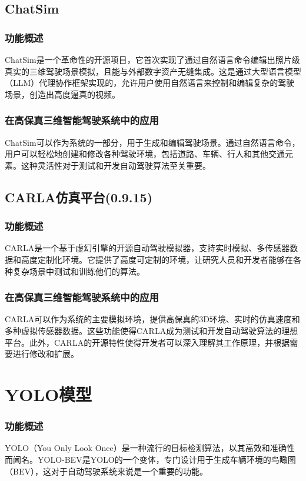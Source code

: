 \documentclass{article}
\begin{document}
\subsection*{ChatSim}
\subsubsection*{功能概述}
ChatSim是一个革命性的开源项目，它首次实现了通过自然语言命令编辑出照片级真实的三维驾驶场景模拟，且能与外部数字资产无缝集成。这是通过大型语言模型（LLM）代理协作框架实现的，允许用户使用自然语言来控制和编辑复杂的驾驶场景，创造出高度逼真的视频。

\subsubsection*{在高保真三维智能驾驶系统中的应用}
ChatSim可以作为系统的一部分，用于生成和编辑驾驶场景。通过自然语言命令，用户可以轻松地创建和修改各种驾驶环境，包括道路、车辆、行人和其他交通元素。这种灵活性对于测试和开发自动驾驶算法至关重要。

\subsection*{CARLA仿真平台(0.9.15)}
\subsubsection*{功能概述}
CARLA是一个基于虚幻引擎的开源自动驾驶模拟器，支持实时模拟、多传感器数据和高度定制化环境。它提供了高度可定制的环境，让研究人员和开发者能够在各种复杂场景中测试和训练他们的算法。

\subsubsection*{在高保真三维智能驾驶系统中的应用}
CARLA可以作为系统的主要模拟环境，提供高保真的3D环境、实时的仿真速度和多种虚拟传感器数据。这些功能使得CARLA成为测试和开发自动驾驶算法的理想平台。此外，CARLA的开源特性使得开发者可以深入理解其工作原理，并根据需要进行修改和扩展。
\section*{YOLO模型}
\subsubsection*{功能概述}
YOLO（You Only Look Once）是一种流行的目标检测算法，以其高效和准确性而闻名。YOLO-BEV是YOLO的一个变体，专门设计用于生成车辆环境的鸟瞰图（BEV），这对于自动驾驶系统来说是一个重要的功能。
\end{document}
